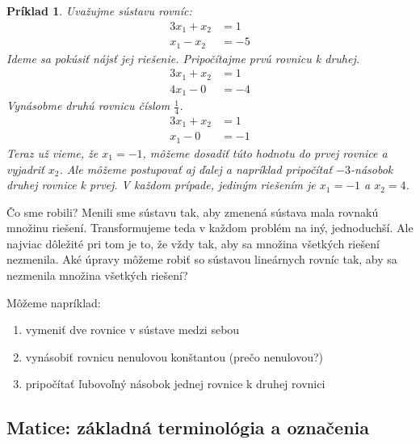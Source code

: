 \documentclass{article}
\newtheorem{example}{Príklad}
\begin{document}
\begin{example}\label{ex:malaSustava}
Uvažujme sústavu rovníc:
\begin{align*}
    3x_1 + x_2 &= 1 \\
    x_1 - x_2 &= -5
\end{align*}
Ideme sa pokúsiť nájsť jej riešenie. Pripočítajme prvú rovnicu k druhej.
\begin{align*}
    3x_1 + x_2 &= 1 \\
    4x_1 - 0 &= -4
\end{align*}
Vynásobme druhú rovnicu číslom $\frac{1}{4}$.
\begin{align*}
    3x_1 + x_2 &= 1 \\
    x_1 - 0 &= -1
\end{align*}
Teraz už vieme, že $x_1=-1$, môžeme dosadiť túto hodnotu do prvej rovnice
a vyjadriť $x_2$. Ale môžeme postupovať aj ďalej a napríklad pripočítať
$-3$-násobok druhej rovnice k prvej.
V každom prípade, jediným riešením je $x_1 = -1$ a $x_2 = 4$.
\end{example}

Čo sme robili? Menili sme sústavu tak, aby zmenená sústava mala rovnakú množinu
riešení. Transformujeme teda v každom problém na iný, jednoduchší. Ale najviac
dôležité pri tom je to, že vždy tak, aby sa množina všetkých riešení nezmenila.
Aké úpravy môžeme robiť so sústavou lineárnych rovníc tak, aby sa nezmenila množina
všetkých riešení?

Môžeme napríklad:
\begin{enumerate}
    \item vymeniť dve rovnice v sústave medzi sebou
    \item vynásobiť rovnicu nenulovou konštantou (prečo nenulovou?)
    \item pripočítať ľubovoľný násobok jednej rovnice k druhej rovnici
\end{enumerate}

\subsection{Matice: základná terminológia a označenia}
\end{document}
